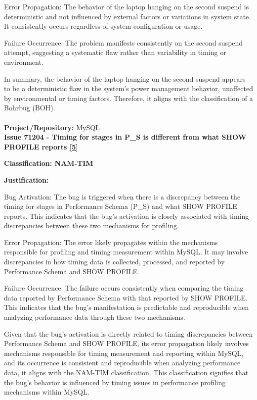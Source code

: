 \documentclass[12pt]{article}
\numberwithin{table}{section}
\begin{document}
	Error Propagation: The behavior of the laptop hanging on the second suspend is deterministic and not influenced by external factors or variations in system state. It consistently occurs regardless of system configuration or usage.
	
	Failure Occurrence: The problem manifests consistently on the second suspend attempt, suggesting a systematic flaw rather than variability in timing or environment.
	
	In summary, the behavior of the laptop hanging on the second suspend appears to be a deterministic flaw in the system's power management behavior, unaffected by environmental or timing factors. Therefore, it aligns with the classification of a Bohrbug (BOH).\\
	\\
	\textbf{{\large Project/Repository: }} MySQL\\
	
	\textbf{Issue 71204 - Timing for stages in P\_S is different from what SHOW PROFILE reports \href{https://bugs.mysql.com/bug.php?id=71204}{[5]}}
	
	\textbf{Classification: NAM-TIM}
	
	\textbf{Justification:}
	
	Bug Activation: The bug is triggered when there is a discrepancy between the timing for stages in Performance Schema (P\_S) and what SHOW PROFILE reports. This indicates that the bug's activation is closely associated with timing discrepancies between these two mechanisms for profiling.
	
	Error Propagation: The error likely propagates within the mechanisms responsible for profiling and timing measurement within MySQL. It may involve discrepancies in how timing data is collected, processed, and reported by Performance Schema and SHOW PROFILE.
	
	Failure Occurrence: The failure occurs consistently when comparing the timing data reported by Performance Schema with that reported by SHOW PROFILE. This indicates that the bug's manifestation is predictable and reproducible when analyzing performance data through these two mechanisms.
	
	Given that the bug's activation is directly related to timing discrepancies between Performance Schema and SHOW PROFILE, its error propagation likely involves mechanisms responsible for timing measurement and reporting within MySQL, and its occurrence is consistent and reproducible when analyzing performance data, it aligns with the NAM-TIM classification. This classification signifies that the bug's behavior is influenced by timing issues in performance profiling mechanisms within MySQL.\\
	
\end{document}
